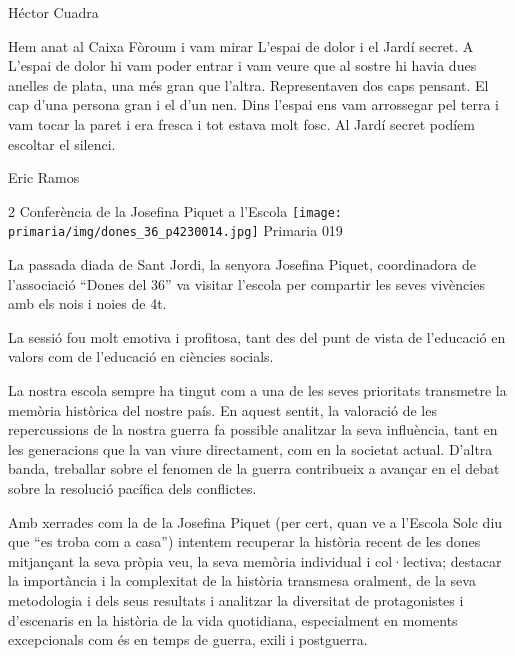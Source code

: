 \begin{news}
Héctor Cuadra

Hem anat al Caixa Fòroum i vam mirar L’espai de dolor i el Jardí secret. A L’espai de dolor hi vam poder entrar i vam veure que al sostre hi havia dues anelles de plata, una més gran que l’altra. Representaven dos caps pensant. El cap d’una persona gran i el d’un nen. Dins l’espai ens vam arrossegar pel terra i vam tocar la paret i era fresca i tot estava molt fosc. Al Jardí secret podíem escoltar el silenci.

Eric Ramos




\end{news}

\begin{news}
{2} %
{Conferència de la Josefina Piquet a l'Escola}
{\noindent\texttt{[image: primaria/img/dones\_36\_p4230014.jpg]}}
{Primaria}
{019} %




La passada diada de Sant Jordi, la senyora Josefina Piquet, coordinadora de l'associació “Dones del 36” va visitar l'escola per compartir les seves vivències amb els nois i noies de 4t.

La sessió fou molt emotiva i profitosa, tant des del punt de vista de l'educació en valors com de l'educació en ciències socials.

La nostra escola sempre ha tingut com a una de les seves prioritats transmetre  la memòria històrica del nostre país. En aquest sentit, la valoració de les repercussions de la nostra guerra fa possible analitzar la seva influència, tant en les generacions que la van viure directament, com en la societat actual. D'altra banda, treballar sobre el fenomen de la guerra contribueix a avançar en el debat sobre la resolució pacífica dels conflictes.

Amb xerrades com la de la Josefina Piquet (per cert, quan ve a l'Escola Solc diu que “es troba com a casa”) intentem recuperar la història recent de les dones mitjançant la seva pròpia veu, la seva memòria individual i col·lectiva; destacar la importància i la complexitat de la història transmesa oralment, de la seva metodologia i dels seus resultats i analitzar la diversitat de protagonistes i d'escenaris en la història de la vida quotidiana, especialment en moments excepcionals com és en temps de guerra, exili i postguerra. 

\end{news}

